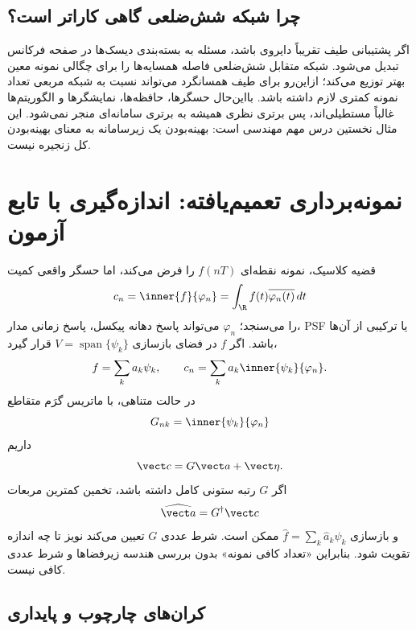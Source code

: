 \subsection{چرا شبکه شش‌ضلعی گاهی کاراتر است؟}

اگر پشتیبانی طیف تقریباً دایروی باشد، مسئله به بسته‌بندی دیسک‌ها در صفحه فرکانس تبدیل می‌شود.
شبکه متقابل شش‌ضلعی فاصله همسایه‌ها را برای چگالی نمونه معین بهتر توزیع می‌کند؛ ازاین‌رو برای
طیف همسانگرد می‌تواند نسبت به شبکه مربعی تعداد نمونه کمتری لازم داشته باشد. بااین‌حال حسگرها،
حافظه‌ها، نمایشگرها و الگوریتم‌ها غالباً مستطیلی‌اند، پس برتری نظری همیشه به برتری سامانه‌ای
منجر نمی‌شود. این مثال نخستین درس مهم مهندسی است: بهینه‌بودن یک زیرسامانه به معنای بهینه‌بودن
کل زنجیره نیست.


\section{نمونه‌برداری تعمیم‌یافته: اندازه‌گیری با تابع آزمون}

قضیه کلاسیک، نمونه نقطه‌ای \(f(nT)\) را فرض می‌کند، اما حسگر واقعی کمیت
\begin{equation}
c_n=\inner{f}{\varphi_n}
=\int_{\R}f(t)\overline{\varphi_n(t)}\,dt
\label{eq:generalized-sample}
\end{equation}
را می‌سنجد؛ \(\varphi_n\) می‌تواند پاسخ دهانه پیکسل، پاسخ زمانی مدار، PSF یا ترکیبی از آن‌ها باشد.
اگر \(f\) در فضای بازسازی \(V=\operatorname{span}\{\psi_k\}\) قرار گیرد،
\begin{equation}
f=\sum_k a_k\psi_k,
\qquad
c_n=\sum_k a_k\inner{\psi_k}{\varphi_n}.
\end{equation}
در حالت متناهی، با ماتریس گرَم متقاطع
\begin{equation}
G_{nk}=\inner{\psi_k}{\varphi_n}
\end{equation}
داریم
\begin{equation}
\vect c=G\vect a+\vect\eta.
\label{eq:generalized-linear}
\end{equation}
اگر \(G\) رتبه ستونی کامل داشته باشد، تخمین کمترین مربعات
\begin{equation}
\widehat{\vect a}=G^\dagger\vect c
\end{equation}
و بازسازی \(\widehat f=\sum_k\widehat a_k\psi_k\) ممکن است. شرط عددی \(G\) تعیین می‌کند نویز تا چه
اندازه تقویت شود. بنابراین «تعداد کافی نمونه» بدون بررسی هندسه زیر‌فضاها و شرط عددی کافی نیست.

\subsection{کران‌های چارچوب و پایداری}

